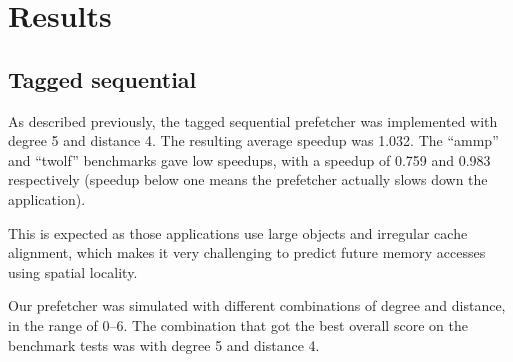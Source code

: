 \section{Results}

\subsection{Tagged sequential}

As described previously, the tagged sequential prefetcher was  implemented with
degree 5 and distance 4. The resulting average speedup was 1.032. The ``ammp''
and ``twolf'' benchmarks gave low speedups, with a speedup of
0.759 and 0.983 respectively (speedup below one means the prefetcher actually
slows down the application).


This is expected as those applications use large
objects and irregular cache alignment,  which makes it very challenging to
predict future memory accesses using spatial locality.


Our prefetcher was simulated with different combinations of degree and distance,
in the range of 0--6. The combination that got the best overall score on the
benchmark tests was with degree 5 and distance 4.

\begin{comment}
\begin{figure}[tbp]
\begin{center}
    
    \caption{Speedup using the tagged sequential prefetcher}
    \label{graph:tagged-sequential}
\end{center}
\end{figure}

\begin{figure}[tbp]
\begin{center}
    
    \caption{Speedup using the DCPT prefetcher}
    \label{graph:dcpt}
\end{center}
\end{figure}
\end{comment}